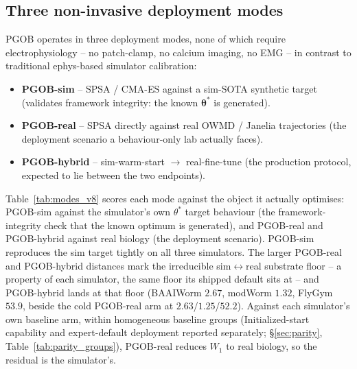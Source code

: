 \documentclass[11pt]{article}
\begin{document}
\subsection{Three non-invasive deployment modes}
\label{sec:modes_v8}

PGOB operates in three deployment modes, none of which require electrophysiology -- no patch-clamp, no calcium imaging, no EMG -- in contrast to traditional ephys-based simulator calibration:
\begin{itemize}\itemsep0pt
\item \textbf{PGOB-sim} -- SPSA / CMA-ES against a sim-SOTA synthetic target (validates framework integrity: the known $\boldsymbol\theta^{*}$ is generated).
\item \textbf{PGOB-real} -- SPSA directly against real OWMD / Janelia trajectories (the deployment scenario a behaviour-only lab actually faces).
\item \textbf{PGOB-hybrid} -- sim-warm-start $\to$ real-fine-tune (the production protocol, expected to lie between the two endpoints).
\end{itemize}

Table~\ref{tab:modes_v8} scores each mode against the object it actually optimises: PGOB-sim against the simulator's own $\theta^{*}$ target behaviour (the framework-integrity check that the known optimum is generated), and PGOB-real and PGOB-hybrid against real biology (the deployment scenario). PGOB-sim reproduces the sim target tightly on all three simulators. The larger PGOB-real and PGOB-hybrid distances mark the irreducible sim$\leftrightarrow$real substrate floor -- a property of each simulator, the same floor its shipped default sits at -- and PGOB-hybrid lands at that floor (BAAIWorm $2.67$, modWorm $1.32$, FlyGym $53.9$, beside the cold PGOB-real arm at $2.63$/$1.25$/$52.2$). Against each simulator's own baseline arm, within homogeneous baseline groups (Initialized-start capability and expert-default deployment reported separately; \S\ref{sec:parity}, Table~\ref{tab:parity_groups}), PGOB-real reduces $W_1$ to real biology, so the residual is the simulator's.
\end{document}
